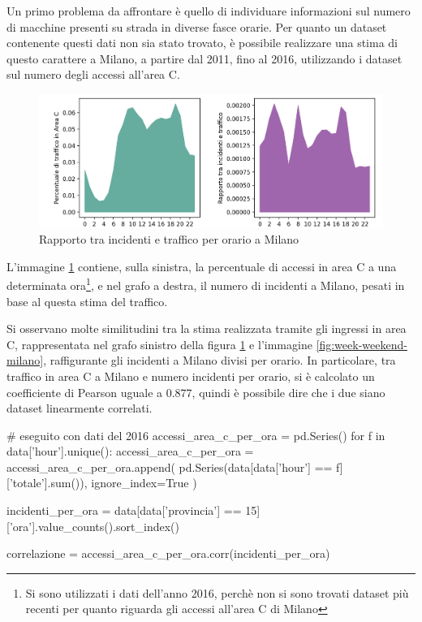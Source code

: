 \documentclass[a4paper,12pt]{report}
\begin{document}
Un primo problema da affrontare è quello di individuare informazioni sul 
numero di macchine presenti su strada in diverse fasce orarie. 
Per quanto un dataset contenente questi dati non sia stato trovato, 
è possibile realizzare una stima di questo carattere a Milano, 
a partire dal 2011, fino al 2016, utilizzando i dataset sul numero 
degli accessi all'area C.

\begin{figure}
    \includegraphics[width=\linewidth]{../src/area_c/rapporto_orario.png}
    \caption{Rapporto tra incidenti e traffico per orario a Milano}
    \label{fig:rapporto-incidenti-traffico}
\end{figure}

L'immagine \ref{fig:rapporto-incidenti-traffico} contiene, sulla sinistra, 
la percentuale di accessi in area C a una determinata 
ora\footnote{Si sono utilizzati i dati dell'anno 2016, perchè non si sono trovati 
dataset più recenti per quanto riguarda gli accessi all'area C di Milano}, 
e nel grafo a destra, il numero di incidenti a Milano, pesati in base al 
questa stima del traffico.

Si osservano molte similitudini tra la stima realizzata tramite gli ingressi 
in area C, rappresentata nel grafo sinistro della 
figura \ref{fig:rapporto-incidenti-traffico} e l'immagine \ref{fig:week-weekend-milano}, 
raffigurante gli incidenti a Milano divisi per orario. 
In particolare, tra traffico in area C a Milano e 
numero incidenti per orario, si è calcolato un coefficiente di Pearson uguale a $0.877$, 
quindi è possibile dire che i due siano dataset linearmente correlati.

\begin{code}
# eseguito con dati del 2016
accessi_area_c_per_ora = pd.Series()
for f in data['hour'].unique():
    accessi_area_c_per_ora = accessi_area_c_per_ora.append(
        pd.Series(data[data['hour'] == f]['totale'].sum()), 
        ignore_index=True
        )

incidenti_per_ora = data[data['provincia'] == 15]['ora'].value_counts().sort_index()

correlazione = accessi_area_c_per_ora.corr(incidenti_per_ora)
\end{code}
\end{document}
